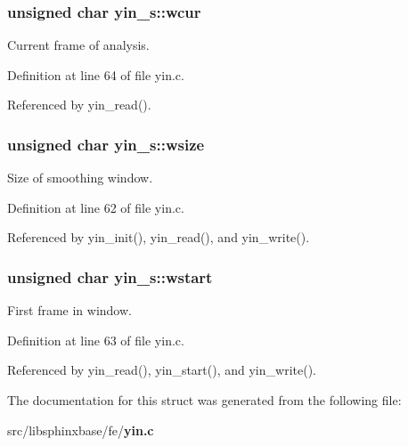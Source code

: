 \subsubsection[{wcur}]{\setlength{\rightskip}{0pt plus 5cm}unsigned char yin\+\_\+s\+::wcur}\label{structyin__s_ab79376deb3761d5d3ae72f727ac25660}


Current frame of analysis. 



Definition at line 64 of file yin.\+c.



Referenced by yin\+\_\+read().

\subsubsection[{wsize}]{\setlength{\rightskip}{0pt plus 5cm}unsigned char yin\+\_\+s\+::wsize}\label{structyin__s_a024d8e9d70f94a7f62457154fb5a4b03}


Size of smoothing window. 



Definition at line 62 of file yin.\+c.



Referenced by yin\+\_\+init(), yin\+\_\+read(), and yin\+\_\+write().

\subsubsection[{wstart}]{\setlength{\rightskip}{0pt plus 5cm}unsigned char yin\+\_\+s\+::wstart}\label{structyin__s_a18481851da6db4df2a469b80c2c5704e}


First frame in window. 



Definition at line 63 of file yin.\+c.



Referenced by yin\+\_\+read(), yin\+\_\+start(), and yin\+\_\+write().



The documentation for this struct was generated from the following file\+:\begin{DoxyCompactItemize}
\item 
src/libsphinxbase/fe/{\bf yin.\+c}\end{DoxyCompactItemize}
